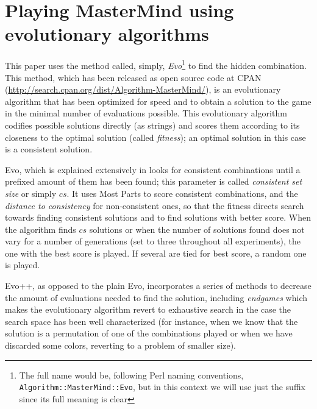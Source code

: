 \documentclass[conference]{IEEEtran}
\begin{document}
\section{Playing MasterMind using evolutionary algorithms}
\label{sec:evo}

This paper uses the
method called, simply, {\em Evo}\footnote{The full name would be,
  following Perl naming conventions, {\tt Algorithm::MasterMind::Evo},
  but in this context we will use just the suffix since its full
  meaning is clear}
\cite{evostar,mm:ppsn:2010,mm:cig,DBLP:conf/evoW/GuervosCM11,DBLP:conf/cec/GuervosMC11}
to find the hidden combination. This
method, which has been released as open  
source code at CPAN
(\url{http://search.cpan.org/dist/Algorithm-MasterMind/}), is an
evolutionary algorithm that has been optimized for speed and to obtain
a solution to the game in the minimal 
number of evaluations possible. This evolutionary
algorithm codifies possible solutions directly (as strings) and
scores them according to its closeness to the optimal
solution (called {\em fitness}); an optimal solution in this case is a
consistent solution.

Evo, which is explained extensively in
\cite{DBLP:conf/cec/GuervosMC11} looks for consistent combinations
until a prefixed amount of them has been found; this parameter is
called {\em consistent set size} or simply $cs$. It uses Most Parts to
score consistent combinations, and the {\em distance to consistency}
for non-consistent ones, so that the fitness directs search towards
finding consistent solutions and to find solutions with better
score. When the algorithm finds $cs$ solutions or when the number of
solutions found does not vary for a number of generations (set to
three throughout all experiments), the one with the best score is
played. If several are tied for best score, a random one is played. 

Evo++, as opposed to the plain Evo,
incorporates a series of methods to decrease the amount of
evaluations needed to find the solution, including {\em endgames} \cite{DBLP:conf/cec/GuervosMC11}
which makes the evolutionary algorithm revert to exhaustive search in
the case the search space has been well characterized (for instance,
when we know that the solution is a permutation of one of the
combinations played or when we have discarded some colors, reverting
to a problem of smaller size). 
\end{document}
